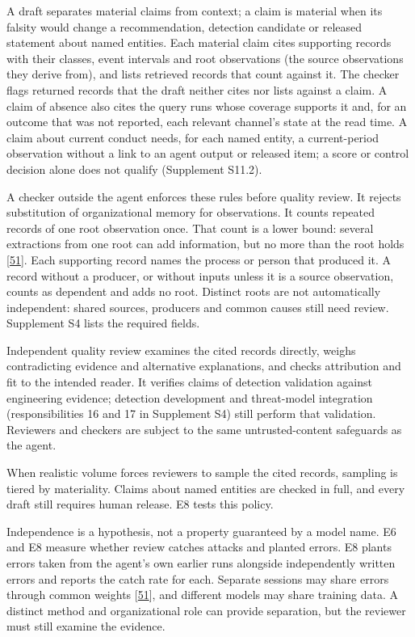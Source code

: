 \documentclass[acmlarge,review,anonymous,nonacm]{acmart}
\begin{document}
A draft separates material claims from context; a claim is material when
its falsity would change a recommendation, detection candidate or
released statement about named entities. Each material claim cites
supporting records with their classes, event intervals and root
observations (the source observations they derive from), and lists
retrieved records that count against it. The checker flags returned
records that the draft neither cites nor lists against a claim. A claim
of absence also cites the query runs whose coverage supports it and, for
an outcome that was not reported, each relevant channel's state at the
read time. A claim about current conduct needs, for each named entity, a
current-period observation without a link to an agent output or released
item; a score or control decision alone does not qualify (Supplement
S11.2).

A checker outside the agent enforces these rules before quality review.
It rejects substitution of organizational memory for observations. It
counts repeated records of one root observation once. That count is a
lower bound: several extractions from one root can add information, but
no more than the root holds
{[}\protect\hyperlink{ref-Bara2026EpistemicSybil}{51}{]}. Each
supporting record names the process or person that produced it. A record
without a producer, or without inputs unless it is a source observation,
counts as dependent and adds no root. Distinct roots are not
automatically independent: shared sources, producers and common causes
still need review. Supplement S4 lists the required fields.

Independent quality review examines the cited records directly, weighs
contradicting evidence and alternative explanations, and checks
attribution and fit to the intended reader. It verifies claims of
detection validation against engineering evidence; detection development
and threat-model integration (responsibilities 16 and 17 in Supplement
S4) still perform that validation. Reviewers and checkers are subject to
the same untrusted-content safeguards as the agent.

When realistic volume forces reviewers to sample the cited records,
sampling is tiered by materiality. Claims about named entities are
checked in full, and every draft still requires human release. E8 tests
this policy.

Independence is a hypothesis, not a property guaranteed by a model name.
E6 and E8 measure whether review catches attacks and planted errors. E8
plants errors taken from the agent's own earlier runs alongside
independently written errors and reports the catch rate for each.
Separate sessions may share errors through common weights
{[}\protect\hyperlink{ref-Bara2026EpistemicSybil}{51}{]}, and different
models may share training data. A distinct method and organizational
role can provide separation, but the reviewer must still examine the
evidence.
\end{document}
